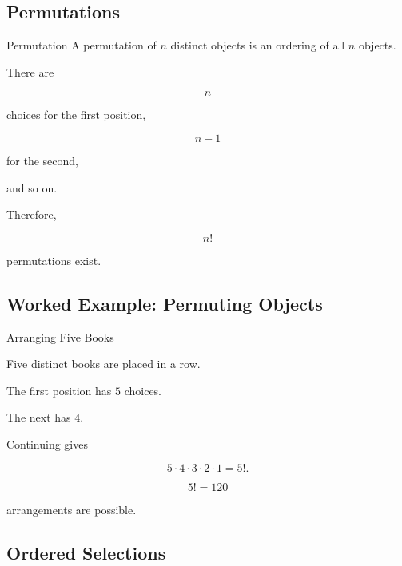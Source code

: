 \subsection{Permutations}
\label{subsec:permutations-basic-counting}

\begin{definitionbox}{Permutation}
A permutation of \(n\) distinct objects is an ordering of all \(n\)
objects.
\end{definitionbox}

There are

\[
n
\]

choices for the first position,

\[
n-1
\]

for the second,

and so on.

Therefore,

\[
\boxed{
n!
}
\]

permutations exist.

\subsection{Worked Example: Permuting Objects}
\label{subsec:worked-permutations}

\begin{workedexamplebox}{Arranging Five Books}

Five distinct books are placed in a row.

The first position has \(5\) choices.

The next has \(4\).

Continuing gives

\[
5\cdot4\cdot3\cdot2\cdot1
=
5!.
\]

\begin{answerbox}
\[
\boxed{
5!=120
}
\]

arrangements are possible.
\end{answerbox}

\end{workedexamplebox}

\subsection{Ordered Selections}
\label{subsec:ordered-selections}

